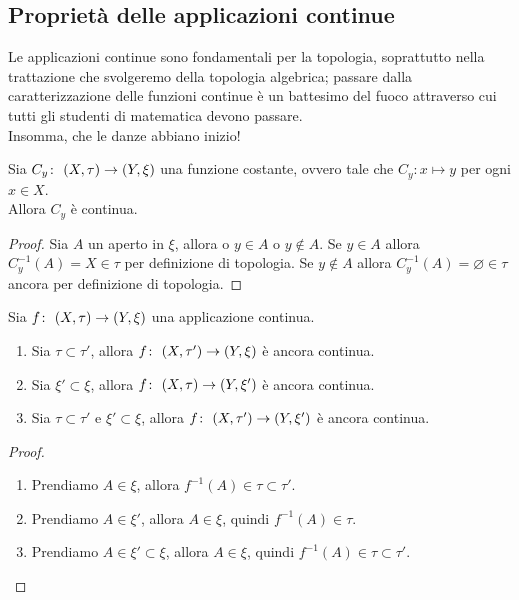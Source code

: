 \subsection{\textcolor{TopGener}{\textbf{Proprietà delle applicazioni continue}}}
Le applicazioni continue sono fondamentali per la topologia, soprattutto nella trattazione che svolgeremo della topologia algebrica; passare dalla caratterizzazione delle funzioni continue è un battesimo del fuoco attraverso cui tutti gli studenti di matematica devono passare. \\ Insomma, che le danze abbiano inizio!



\begin{theorem}
	Sia $C_y \colon\ (X,\tau) \rightarrow (Y,\xi)$ una funzione costante, ovvero tale che $C_y : x \mapsto y$ per ogni $x \in X$. \\ Allora $C_y$ è continua.
\end{theorem}
\begin{proof}
	Sia $A$ un aperto in $\xi$, allora o $y \in A$ o $y \notin A$. Se $y \in A$ allora $C^{-1}_y(A) = X \in \tau$ per definizione di topologia. Se $y \notin A$ allora $C^{-1}_y(A) = \varnothing \in \tau$ ancora per definizione di topologia.
\end{proof}

\begin{theorem}
	Sia $f \colon\ (X,\tau) \rightarrow (Y,\xi)$ una applicazione continua. 
	\begin{enumerate}
		\item Sia $\tau \subset \tau'$, allora $f \colon\ (X,\tau') \rightarrow (Y,\xi)$ è ancora continua.
		\item Sia $\xi' \subset \xi$, allora $f \colon\ (X,\tau) \rightarrow (Y,\xi')$ è ancora continua.
		\item Sia $\tau \subset \tau'$ e $\xi' \subset \xi$, allora $f \colon\ (X,\tau') \rightarrow (Y,\xi')$ è ancora continua.
	\end{enumerate}
\end{theorem}
\begin{proof} \
	\begin{enumerate}
		\item Prendiamo $A \in \xi$, allora $f^{-1}(A) \in \tau \subset \tau'$.
		\item Prendiamo $A \in \xi'$, allora $A \in \xi$, quindi $f^{-1}(A) \in \tau$. 
		\item Prendiamo $A \in \xi' \subset \xi$, allora $A \in \xi$, quindi $f^{-1}(A) \in \tau \subset \tau'$.
	\end{enumerate}
\end{proof}

